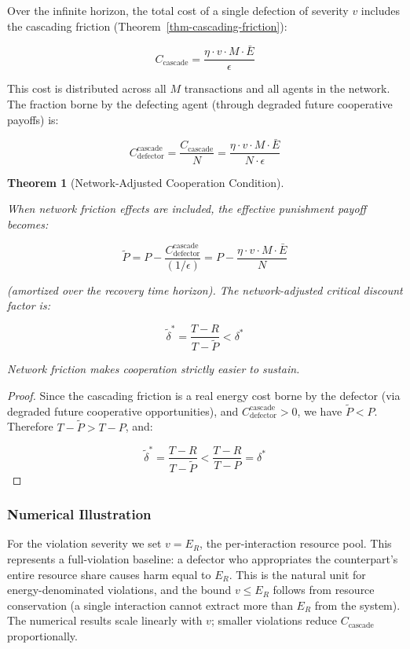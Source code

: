 \documentclass[11pt]{article}
\theoremstyle{plain}
\newtheorem{theorem}{Theorem}
\theoremstyle{definition}
\theoremstyle{remark}
\let\origsubsubsection\subsubsection
\renewcommand{\subsubsection}{\needspace{4\baselineskip}\origsubsubsection}
\begin{document}
Over the infinite horizon, the total cost of a single defection of
severity \(v\) includes the cascading friction
(Theorem~\ref{thm-cascading-friction}):

\[C_{\text{cascade}} = \frac{\eta \cdot v \cdot M \cdot \bar{E}}{\epsilon}\]

This cost is distributed across all \(M\) transactions and all agents in
the network. The fraction borne by the defecting agent (through degraded
future cooperative payoffs) is:

\[C_{\text{defector}}^{\text{cascade}} = \frac{C_{\text{cascade}}}{N} = \frac{\eta \cdot v \cdot M \cdot \bar{E}}{N \cdot \epsilon}\]

\begin{theorem}[Network-Adjusted Cooperation Condition]
\label{thm-network-adjusted-cooperation}

When network friction effects are included, the effective punishment payoff becomes:

$$\tilde{P} = P - \frac{C_{\text{defector}}^{\text{cascade}}}{(1/\epsilon)} = P - \frac{\eta \cdot v \cdot M \cdot \bar{E}}{N}$$

(amortized over the recovery time horizon). The network-adjusted critical discount factor is:

$$\tilde{\delta}^* = \frac{T - R}{T - \tilde{P}} < \delta^*$$

Network friction makes cooperation strictly easier to sustain.
\end{theorem}

\begin{proof}
Since the cascading friction is a real energy cost borne by the defector (via degraded future cooperative opportunities), and $C_{\text{defector}}^{\text{cascade}} > 0$, we have $\tilde{P} < P$. Therefore $T - \tilde{P} > T - P$, and:

$$\tilde{\delta}^* = \frac{T - R}{T - \tilde{P}} < \frac{T - R}{T - P} = \delta^*$$
\end{proof}

\subsubsection{Numerical Illustration}\label{numerical-illustration-1}

For the violation severity we set \(v = E_R\), the per-interaction
resource pool. This represents a full-violation baseline: a defector who
appropriates the counterpart's entire resource share causes harm equal
to \(E_R\). This is the natural unit for energy-denominated violations,
and the bound \(v \leq E_R\) follows from resource conservation (a
single interaction cannot extract more than \(E_R\) from the system).
The numerical results scale linearly with \(v\); smaller violations
reduce \(C_{\text{cascade}}\) proportionally.
\end{document}
